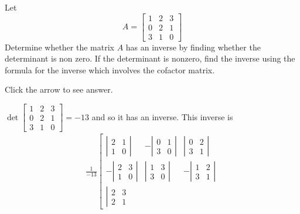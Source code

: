 \documentclass{ximera}
\begin{document}
\begin{problem}\label{prb:7.26} Let
\begin{equation*}
A=
\left[
\begin{array}{rrr}
1 & 2 & 3 \\
0 & 2 & 1 \\
3 & 1 & 0
\end{array}
\right]
\end{equation*}
Determine whether the matrix $A$ has an inverse by finding whether the
determinant is non zero. If the determinant is nonzero, find the inverse
using the formula for the inverse which involves the cofactor matrix.

Click the arrow to see answer.
\begin{expandable}
$\det
\left[
\begin{array}{ccc}
1 & 2 & 3 \\
0 & 2 & 1 \\
3 & 1 & 0
\end{array}
\right] = -13$ and so it has an inverse. This inverse is
\begin{eqnarray*}
\frac{1}{-13}\left[
\begin{array}{rrr}
\left\vert
\begin{array}{cc}
2 & 1 \\
1 & 0
\end{array}
\right\vert  & -\left\vert
\begin{array}{cc}
0 & 1 \\
3 & 0
\end{array}
\right\vert  & \left\vert
\begin{array}{cc}
0 & 2 \\
3 & 1
\end{array}
\right\vert  \\
-\left\vert
\begin{array}{cc}
2 & 3 \\
1 & 0
\end{array}
\right\vert  & \left\vert
\begin{array}{cc}
1 & 3 \\
3 & 0
\end{array}
\right\vert  & -\left\vert
\begin{array}{cc}
1 & 2 \\
3 & 1
\end{array}
\right\vert  \\
\left\vert
\begin{array}{cc}
2 & 3 \\
2 & 1
\end{array}

\end{array}
\end{eqnarray*}
\end{expandable}
\end{problem}
\end{document}
